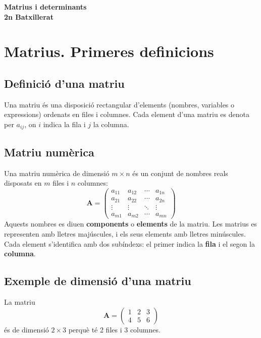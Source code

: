 \documentclass[12pt]{article}
\newcommand{\mat}[1]{\mathbf{#1}}
\begin{document}
\begin{titlepage}
    \centering
    {\Huge \textbf{Matrius i determinants \\ 2n Batxillerat} \par}
    \vspace{1cm}
    \vspace{1cm}
    \tableofcontents
\end{titlepage}

\newpage

\section{Matrius. Primeres definicions}

\subsection{Definició d'una matriu}
\begin{concept}
Una matriu és una disposició rectangular d'elements (nombres, variables o expressions) ordenats en files i columnes. Cada element d'una matriu es denota per $a_{ij}$, on $i$ indica la fila i $j$ la columna.
\end{concept}

\subsection{Matriu numèrica}
\begin{concept}
Una matriu numèrica de dimensió $m \times n$ és un conjunt de nombres reals disposats en $m$ files i $n$ columnes:
\[
\mat{A} = 
\begin{pmatrix}
a_{11} & a_{12} & \cdots & a_{1n} \\
a_{21} & a_{22} & \cdots & a_{2n} \\
\vdots & \vdots & \ddots & \vdots \\
a_{m1} & a_{m2} & \cdots & a_{mn}
\end{pmatrix}
\]
Aquests nombres es diuen \textbf{components} o \textbf{elements} de la matriu. Les matrius es representen amb lletres majúscules, i els seus elements amb lletres minúscules. Cada element s'identifica amb dos subíndexs: el primer indica la \textbf{fila} i el segon la \textbf{columna}.
\end{concept}

\subsection*{Exemple de dimensió d'una matriu}
\begin{exemple}
La matriu 
\[
\mat{A} = \begin{pmatrix}
1 & 2 & 3 \\
4 & 5 & 6
\end{pmatrix}
\]
és de dimensió $2 \times 3$ perquè té 2 files i 3 columnes.
\end{exemple}
\end{document}
